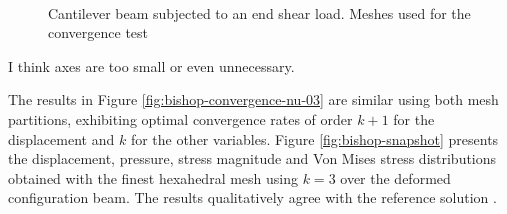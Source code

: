 \documentclass[english,11pt,3p,number,sort&compress]{elsarticle}
\newcommand{\nathan}{\color{red}{\bf\Large NS} \color{cyan} }
\begin{document}
\begin{figure}[H]
	\centering
	 \\
	\caption{Cantilever beam subjected to an end shear load. Meshes used for the convergence test}
	\label{fig:bishop-meshes}
\end{figure}

{\nathan I think axes are too small or even unnecessary.}

The results in Figure \ref{fig:bishop-convergence-nu-03} are similar using both mesh partitions, exhibiting optimal convergence rates of order $k+1$ for the displacement and $k$ for the other variables. Figure \ref{fig:bishop-snapshot} presents the displacement, pressure, stress magnitude and Von Mises stress distributions obtained with the finest hexahedral mesh using $k=3$ over the deformed configuration beam. The results qualitatively agree with the reference solution \cite{bishop2014displacement}.
\end{document}

